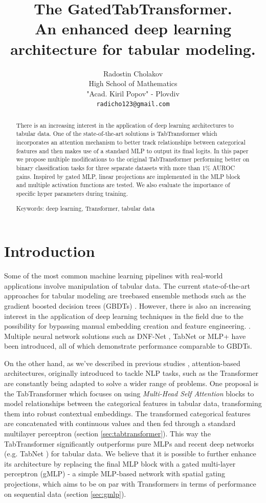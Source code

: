 \documentclass{article}
\title[The GatedTabTransformer]{The GatedTabTransformer.\\
An enhanced deep learning\\
architecture for tabular modeling.}
\author[R. Cholakov]{%
Radostin Cholakov\\%
High School of Mathematics\\%
"Acad. Kiril Popov" - Plovdiv\\%
\texttt{radicho123@gmail.com}%
}
\begin{document}
\maketitle
\begin{abstract}
    There is an increasing interest in the application of deep learning architectures to tabular data. One of the state-of-the-art solutions is TabTransformer which incorporates an attention mechanism to better track relationships between categorical features and then makes use of a standard MLP to output its final logits. In this paper we propose multiple modifications to the original TabTransformer performing better on binary classification tasks for three separate datasets with more than 1\% AUROC gains. Inspired by gated MLP, linear projections are implemented in the MLP block and multiple activation functions are tested. We also evaluate the importance of specific hyper parameters during training.

    \medskip
    Keywords: deep learning, Transformer, tabular data
\end{abstract}

\section{Introduction}

Some of the most common machine learning pipelines with real-world applications involve manipulation of tabular data. The current state-of-the-art approaches for tabular modeling are treebased ensemble methods such as the gradient boosted decision trees (GBDTs) \cite{chen2016xgboost}. However, there is also an increasing interest in the application of deep learning techniques in the field due to the possibility for bypassing manual embedding creation and feature engineering. \cite{fiedler2021simple}. Multiple neural network solutions such as DNF-Net \cite{abutbul2020dnf}, TabNet \cite{arik1908tabnet} or MLP+ \cite{fiedler2021simple} have been introduced, all of which demonstrate performance comparable to GBDTs.

On the other hand, as we've described in previous studies \cite{cholakov2021transformers}, attention-based architectures, originally introduced to tackle NLP tasks, such as the Transformer \cite{vaswani2017attention} are constantly being adapted to solve a wider range of problems. One proposal is the TabTransformer \cite{Huang2020TabTransformerTD} which focuses on using \textit{Multi-Head Self Attention} blocks to model relationships between the categorical features in tabular data, transforming them into robust contextual embeddings. The transformed categorical features are concatenated with continuous values and then fed through a standard multilayer perceptron \cite{haykin1994neural} (section \ref{sec:tabtransformer}). This way the TabTransformer significantly outperforms pure MLPs and recent deep networks (e.g. TabNet \cite{arik1908tabnet}) for tabular data. We believe that it is possible to further enhance its architecture by replacing the final MLP block with a gated multi-layer perceptron (gMLP) \cite{Liu2021PayAT} - a simple MLP-based network with spatial gating projections, which aims to be on par with Transformers in terms of performance on sequential data (section \ref{sec:gmlp}).
\end{document}
